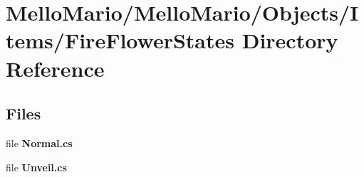 \section{Mello\+Mario/\+Mello\+Mario/\+Objects/\+Items/\+Fire\+Flower\+States Directory Reference}
\label{dir_f200590655571dbe807b989046749c5e}
\subsection*{Files}
\begin{DoxyCompactItemize}
\item 
file \textbf{ Normal.\+cs}
\item 
file \textbf{ Unveil.\+cs}
\end{DoxyCompactItemize}
